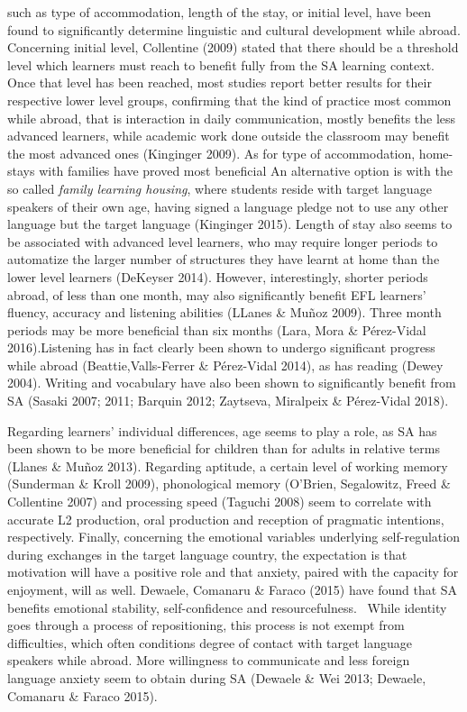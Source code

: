 \documentclass[12pt]{article}
\newenvironment{styleStandard}{\setlength\leftskip{0cm}\setlength\rightskip{0cm plus 1fil}\setlength\parindent{0cm}\setlength\parfillskip{0pt plus 1fil}\setlength\parskip{0in plus 1pt}\writerlistparindent\writerlistleftskip\leavevmode\normalfont\normalsize\writerlistlabel\ignorespaces}{\unskip\vspace{0.111in plus 0.0111in}\par}
\newcommand\writerlistleftskip{}
\newcommand\writerlistparindent{}
\newcommand\writerlistlabel{}
\begin{document}
\begin{styleStandard}
such as type of accommodation, length of the stay, or initial level, have been found to significantly determine linguistic and cultural development while abroad. Concerning initial level, Collentine (2009) stated that there should be a threshold level which learners must reach to benefit fully from the SA learning context. Once that level has been reached, most studies report better results for their respective lower level groups, confirming that the kind of practice most common while abroad, that is interaction in daily communication, mostly benefits the less advanced learners, while academic work done outside the classroom may benefit the most advanced ones (Kinginger 2009). As for type of accommodation, home-stays with families have proved most beneficial An alternative option is with the so called \textit{family learning housing}, where students reside with target language speakers of their own age, having signed a language pledge not to use any other language but the target language (Kinginger 2015). Length of stay also seems to be associated with advanced level learners, who may require longer periods to automatize the larger number of structures they have learnt at home than the lower level learners (DeKeyser 2014). However, interestingly, shorter periods abroad, of less than one month, may also significantly benefit EFL learners’ fluency, accuracy and listening abilities (LLanes \& Muñoz 2009). Three month periods may be more beneficial than six months (Lara, Mora \& Pérez-Vidal 2016).Listening has in fact clearly been shown to undergo significant progress while abroad (Beattie,Valls-Ferrer \& Pérez-Vidal 2014), as has reading (Dewey 2004). Writing and vocabulary have also been shown to significantly benefit from SA (Sasaki 2007; 2011; Barquin 2012; Zaytseva, Miralpeix \& Pérez-Vidal 2018).
\end{styleStandard}

\begin{styleStandard}
Regarding learners’ individual differences, age seems to play a role, as SA has been shown to be more beneficial for children than for adults in relative terms (Llanes \& Muñoz 2013). Regarding aptitude, a certain level of working memory (Sunderman \& Kroll 2009), phonological memory (O’Brien, Segalowitz, Freed \& Collentine 2007) and processing speed (Taguchi 2008) seem to correlate with accurate L2 production, oral production and reception of pragmatic intentions, respectively. Finally, concerning the emotional variables underlying self-regulation during exchanges in the target language country, the expectation is that motivation will have a positive role and that anxiety, paired with the capacity for enjoyment, will as well. Dewaele, Comanaru \& Faraco (2015) have found that SA benefits emotional stability, self-confidence and resourcefulness. \ While identity goes through a process of repositioning, this process is not exempt from difficulties, which often conditions degree of contact with target language speakers while abroad. More willingness to communicate and less foreign language anxiety seem to obtain during SA (Dewaele \& Wei 2013; Dewaele, Comanaru \& Faraco 2015). 
\end{styleStandard}
\end{document}
